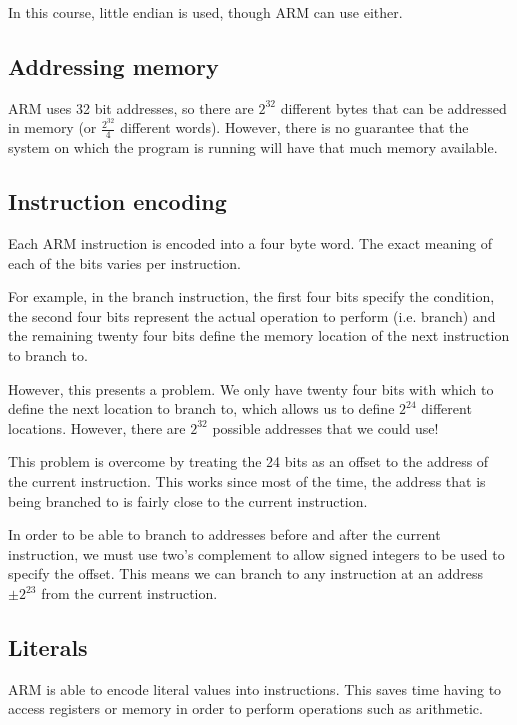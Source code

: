 \documentclass{article}
\begin{document}
In this course, little endian is used, though ARM can use either.

\subsection{Addressing memory}

ARM uses 32 bit addresses, so there are $2^{32}$ different bytes that can be addressed in memory (or $\frac{2^{32}}{4}$ different words). However, there is no guarantee that the system on which the program is running will have that much memory available.

\subsection{Instruction encoding}

Each ARM instruction is encoded into a four byte word. The exact meaning of each of the bits varies per instruction.

For example, in the branch instruction, the first four bits specify the condition, the second four bits represent the actual operation to perform (i.e. branch) and the remaining twenty four bits define the memory location of the next instruction to branch to.

However, this presents a problem. We only have twenty four bits with which to define the next location to branch to, which allows us to define $2^24$ different locations. However, there are $2^32$ possible addresses that we could use!

This problem is overcome by treating the 24 bits as an offset to the address of the current instruction. This works since most of the time, the address that is being branched to is fairly close to the current instruction.

In order to be able to branch to addresses before and after the current instruction, we must use two's complement to allow signed integers to be used to specify the offset. This means we can branch to any instruction at an address $\pm 2^{23}$ from the current instruction.

\subsection{Literals}

ARM is able to encode literal values into instructions. This saves time having to access registers or memory in order to perform operations such as arithmetic.
\end{document}
